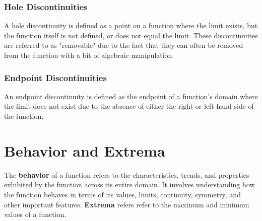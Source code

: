 \documentclass{article}
\begin{document}
\subsubsection*{Hole Discontinuities}
A hole discontinuity is defined as a point on a function where the limit exists, but the function itself is not defined, or does not equal the limit. These discontinuities are referred to as "removable" due to the fact that they can often be removed from the function with a bit of algebraic manipulation.

\begin{center}
\end{center}

\subsubsection*{Endpoint Discontinuities}
An endpoint discontinuity is defined as the endpoint of a function's domain where the limit does not exist due to the absence of either the right or left hand side of the function. 

\begin{center}
\end{center}

\section{Behavior and Extrema}
The \textbf{behavior} of a function refers to the characteristics, trends, and properties exhibited by the function across its entire domain. It involves understanding how the function behaves in terms of its values, limits, continuity, symmetry, and other important features. \textbf{Extrema} refers refer to the maximum and minimum values of a function.
\end{document}

